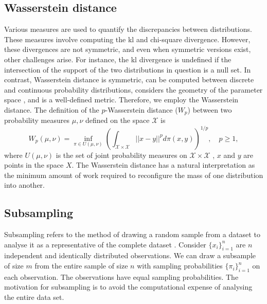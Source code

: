 \documentclass[12pt]{article}
\begin{document}
\subsection{Wasserstein distance}
Various measures are used to quantify the discrepancies between distributions. These measures involve computing the  \gls{kl} and chi-square divergence. However, these divergences \citep{aliGeneralClassCoefficients1966} are not symmetric, and even when symmetric versions exist, other challenges arise. For instance, the \gls{kl} divergence is undefined if the intersection of the support of the two distributions in question is a null set. In contrast, Wasserstein distance is symmetric, can be computed between discrete and continuous probability distributions, considers the geometry of the parameter space \citep{panaretos2019statistical}, and is a well-defined metric. Therefore, we employ the Wasserstein distance.
The definition of the $p$-Wasserstein distance ($W_p$) between two probability
measures $\mu, \nu$ defined on the space $\mathcal{X}$  is 
\begin{equation}
W_p(\mu, \nu) = \inf_{\pi \in U(\mu, \nu)} \left(\int_{\mathcal{X} \times \mathcal{X}}||x-y||^pd\pi(x, y) \right)^{1/p}, \quad p\geq 1,
\label{wasser:ana1}
\end{equation}
where $U(\mu, \nu)$ is the set of joint probability measures on
$\mathcal{X}\times \mathcal{X}$ \citep{villaniOptimalTransportOld2009}, $x$ and $y$ are points in the space $X$. The
Wasserstein distance has a natural interpretation as the minimum amount of work
required to reconfigure the mass of one distribution into another.

\subsection{Subsampling}
Subsampling refers to the method of drawing a random sample from a dataset to analyse it as a representative of the complete dataset \citep{Drineas_2006, yaoReviewOptimalSubsampling2021, Ma_2014}. Consider $\{x_i\}_{i=1}^n$ are $n$ independent and identically distributed observations. We can draw a subsample of size $m$ from the entire sample of size $n$ with sampling probabilities $\{\pi_i\}_{i=1}^n$ on each observation. The observations have equal sampling probabilities. The motivation for subsampling is to avoid the computational expense of analysing the entire data set. 
\end{document}
